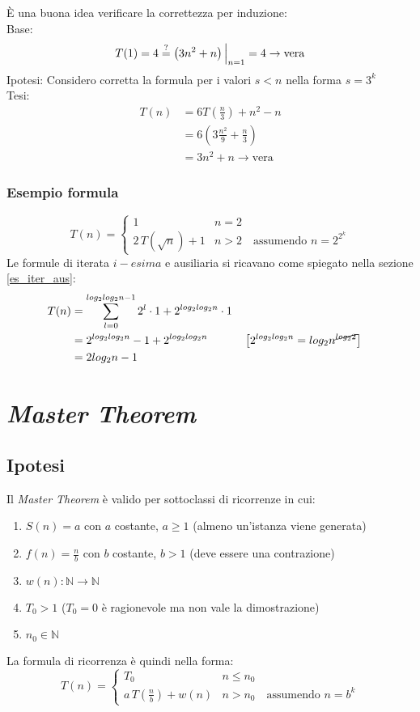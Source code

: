 È una buona idea verificare la correttezza per induzione:\\
Base: 
\[ T(1)=4 \overset{?}{=} \left( 3n^2+n \right) \Big|_{n=1} = 4 \rightarrow \text{vera} \]
Ipotesi: Considero corretta la formula per i valori $s<n$ nella forma $s=3^k$ \\
Tesi:
\begin{align*}
    T(n) &= 6T \left( \frac{n}{3} \right) + n^2 -n \\
    & = 6 \left( 3 \frac{n^2}{9} + \frac{n}{3} \right) \\
    & = 3n^2+n\rightarrow \text{vera}
\end{align*}

\subsubsection{Esempio formula}
\[
    T(n) = 
    \begin{cases} 
        1      &  n = 2 \\
        2 \, T\left( \sqrt{n}\right) + 1 & n > 2 \quad \text{assumendo } n=2^{2^k} 
    \end{cases}
\]
Le formule di iterata $i-esima$ e ausiliaria si ricavano come spiegato nella sezione \ref{es_iter_aus}:
\begin{align*}
    T(n) &= \sum_{l=0}^{log_2 log_2 n-1} 2^l \cdot 1 + 2^{log_2 log_2 n} \cdot 1 \\
    &= 2^{log_2 log_2 n} -1 + 2^{log_2 log_2 n} 
    && \left[ 2^{log_2 log_2 n} = log_2 n ^{\cancel{log_2 2}} \right] \\
    &= 2 log_2 n - 1
\end{align*}

\section{\textit{Master Theorem}}
\subsection{Ipotesi}
Il \textit{Master Theorem} è valido per sottoclassi di ricorrenze in cui:
\begin{enumerate}
    \item $S(n) = a$ con $a$ costante, $a \geq 1$ (almeno un'istanza viene generata)
    \item $f(n) = \frac{n}{b}$ con $b$ costante, $b > 1$ (deve essere una contrazione)
    \item $w(n): \mathbb{N} \rightarrow \mathbb{N}$%
    \item $T_0 > 1$ ($ T_0 = 0$ è ragionevole ma non vale la dimostrazione)
    \item $n_0 \in \mathbb{N}$
\end{enumerate}
La formula di ricorrenza è quindi nella forma:
\[
    T(n) = 
    \begin{cases} 
        T_0      &  n \leq n_0 \\
        a \, T\left( \frac{n}{b} \right) + w(n) & n > n_0 \quad \text{assumendo } n=b^k
    \end{cases}
\]
